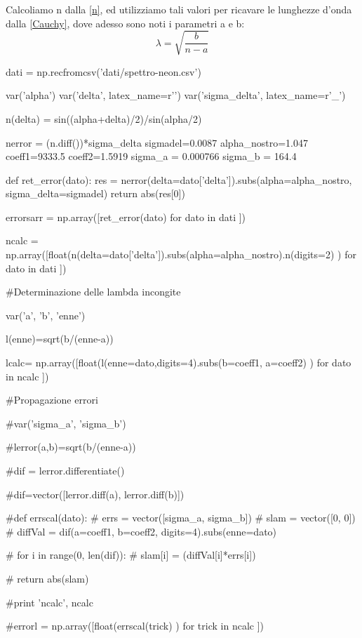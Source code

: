 Calcoliamo n dalla \ref{n}, ed utilizziamo tali valori per ricavare le lunghezze d'onda dalla \ref{Cauchy}, dove adesso sono noti i parametri a e b:
\begin{equation}
\lambda = \sqrt{\frac{b}{n-a}}
\end{equation}




\begin{sagesilent}


dati = np.recfromcsv('dati/spettro-neon.csv')

var('alpha')
var('delta', latex_name=r'\delta')
var('sigma_delta', latex_name=r'\sigma_{\delta}')


n(delta) = sin((alpha+delta)/2)/sin(alpha/2)

nerror = (n.diff())*sigma_delta
sigmadel=0.0087
alpha_nostro=1.047
coeff1=9333.5
coeff2=1.5919
sigma_a = 0.000766
sigma_b = 164.4


def ret_error(dato):
  res = nerror(delta=dato['delta']).subs(alpha=alpha_nostro, sigma_delta=sigmadel)
  return abs(res[0])
  
errorsarr = np.array([ret_error(dato) for dato in dati ])

ncalc = np.array([float(n(delta=dato['delta']).subs(alpha=alpha_nostro).n(digits=2) ) for dato in dati ])

#Determinazione delle lambda incongite

var('a', 'b', 'enne')

l(enne)=sqrt(b/(enne-a))

lcalc= np.array([float(l(enne=dato,digits=4).subs(b=coeff1, a=coeff2)  ) for dato in ncalc ])

#Propagazione errori

#var('sigma_a', 'sigma_b')

#lerror(a,b)=sqrt(b/(enne-a))

#dif = lerror.differentiate()

#dif=vector([lerror.diff(a), lerror.diff(b)])

#def errscal(dato):
 # errs = vector([sigma_a, sigma_b])
 # slam = vector([0, 0])
 # diffVal = dif(a=coeff1, b=coeff2, digits=4).subs(enne=dato)
  
 # for i in range(0, len(dif)):
 #     slam[i] = (diffVal[i]*errs[i])
    
 # return abs(slam)

#print 'ncalc', ncalc

#errorl = np.array([float(errscal(trick) ) for trick in ncalc ])




\end{sagesilent}
